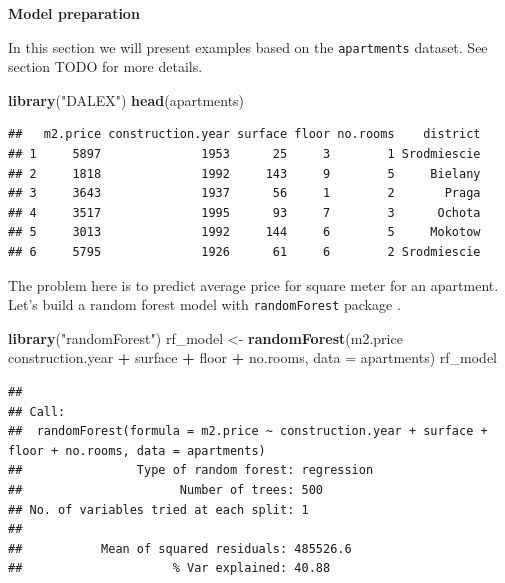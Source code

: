 \documentclass[]{book}
\newenvironment{Shaded}{\begin{snugshade}}{\end{snugshade}}
\newcommand{\DataTypeTok}[1]{\textcolor[rgb]{0.13,0.29,0.53}{#1}}
\newcommand{\KeywordTok}[1]{\textcolor[rgb]{0.13,0.29,0.53}{\textbf{#1}}}
\newcommand{\NormalTok}[1]{#1}
\newcommand{\OperatorTok}[1]{\textcolor[rgb]{0.81,0.36,0.00}{\textbf{#1}}}
\newcommand{\StringTok}[1]{\textcolor[rgb]{0.31,0.60,0.02}{#1}}
\theoremstyle{definition}
\theoremstyle{definition}
\theoremstyle{definition}
\theoremstyle{remark}
\begin{document}
\textbf{Model preparation}

In this section we will present examples based on the
\texttt{apartments} dataset. See section TODO for more details.

\begin{Shaded}
\begin{Highlighting}[]
\KeywordTok{library}\NormalTok{(}\StringTok{"DALEX"}\NormalTok{)}
\KeywordTok{head}\NormalTok{(apartments)}
\end{Highlighting}
\end{Shaded}

\begin{verbatim}
##   m2.price construction.year surface floor no.rooms    district
## 1     5897              1953      25     3        1 Srodmiescie
## 2     1818              1992     143     9        5     Bielany
## 3     3643              1937      56     1        2       Praga
## 4     3517              1995      93     7        3      Ochota
## 5     3013              1992     144     6        5     Mokotow
## 6     5795              1926      61     6        2 Srodmiescie
\end{verbatim}

The problem here is to predict average price for square meter for an
apartment. Let's build a random forest model with \texttt{randomForest}
package \citep{R-randomForest}.

\begin{Shaded}
\begin{Highlighting}[]
\KeywordTok{library}\NormalTok{(}\StringTok{"randomForest"}\NormalTok{)}
\NormalTok{rf_model <-}\StringTok{ }\KeywordTok{randomForest}\NormalTok{(m2.price }\OperatorTok{~}\StringTok{ }\NormalTok{construction.year }\OperatorTok{+}\StringTok{ }\NormalTok{surface }\OperatorTok{+}\StringTok{ }\NormalTok{floor }\OperatorTok{+}
\StringTok{      }\NormalTok{no.rooms, }\DataTypeTok{data =}\NormalTok{ apartments)}
\NormalTok{rf_model}
\end{Highlighting}
\end{Shaded}

\begin{verbatim}
## 
## Call:
##  randomForest(formula = m2.price ~ construction.year + surface +      floor + no.rooms, data = apartments) 
##                Type of random forest: regression
##                      Number of trees: 500
## No. of variables tried at each split: 1
## 
##           Mean of squared residuals: 485526.6
##                     % Var explained: 40.88
\end{verbatim}
\end{document}
